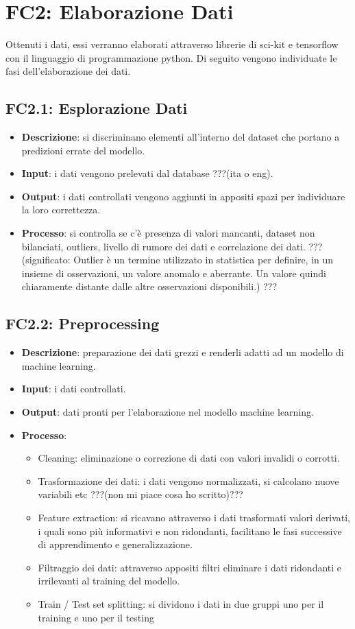 \section{FC2: Elaborazione Dati}
Ottenuti i dati, essi verranno elaborati attraverso librerie di sci-kit e tensorflow con il linguaggio di programmazione python.
Di seguito vengono individuate le fasi dell'elaborazione dei dati.
\subsection{FC2.1: Esplorazione Dati}
\begin{itemize}
	\item \textbf{Descrizione}: si discriminano elementi all'interno del dataset che portano a predizioni errate del modello.
	\item \textbf{Input}: i dati vengono prelevati dal database ???(ita o eng).
	\item \textbf{Output}: i dati controllati vengono aggiunti in appositi spazi per individuare la loro correttezza.
	\item \textbf{Processo}: si controlla se c'è presenza di valori mancanti, dataset non bilanciati, outliers, livello di rumore dei dati e correlazione dei dati. ???(significato: Outlier è un termine utilizzato in statistica per definire, in un insieme di osservazioni, un valore anomalo e aberrante. Un valore quindi chiaramente distante dalle altre osservazioni disponibili.) ???
\end{itemize}
\subsection{FC2.2: Preprocessing}
\begin{itemize}
	\item \textbf{Descrizione}: preparazione dei dati grezzi e renderli adatti ad un modello di machine learning. 
	\item \textbf{Input}: i dati controllati.
	\item \textbf{Output}: dati pronti per l'elaborazione nel modello machine learning.
	\item \textbf{Processo}: \begin{itemize}
		\item Cleaning: eliminazione o correzione di dati con valori invalidi o corrotti.
		\item Trasformazione dei dati: i dati vengono normalizzati, si calcolano nuove variabili etc ???(non mi piace cosa ho scritto)??? 
		\item Feature extraction: si ricavano attraverso i dati trasformati valori derivati, i quali sono più informativi e non ridondanti, facilitano le fasi successive di apprendimento e generalizzazione.
		\item Filtraggio dei dati: attraverso appositi filtri eliminare i dati ridondanti e irrilevanti al training del modello.
		\item Train / Test set splitting: si dividono i dati in due gruppi uno per il training e uno per il testing
	\end{itemize}
\end{itemize}
